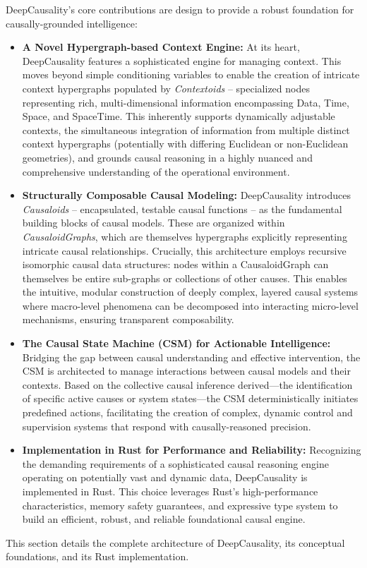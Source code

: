 DeepCausality’s core contributions are design to provide a robust foundation for causally-grounded intelligence:
\begin{itemize}
    \item \textbf{A Novel Hypergraph-based Context Engine:} At its heart, DeepCausality features a sophisticated engine for managing context. This moves beyond simple conditioning variables to enable the creation of intricate context hypergraphs populated by \textit{Contextoids} – specialized nodes representing rich, multi-dimensional information encompassing Data, Time, Space, and SpaceTime. This inherently supports dynamically adjustable contexts, the simultaneous integration of information from multiple distinct context hypergraphs (potentially with differing Euclidean or non-Euclidean geometries), and grounds causal reasoning in a highly nuanced and comprehensive understanding of the operational environment.
    \item \textbf{Structurally Composable Causal Modeling:} DeepCausality introduces \textit{Causaloids} – encapsulated, testable causal functions – as the fundamental building blocks of causal models. These are organized within \textit{CausaloidGraphs}, which are themselves hypergraphs explicitly representing intricate causal relationships. Crucially, this architecture employs recursive isomorphic causal data structures: nodes within a CausaloidGraph can themselves be entire sub-graphs or collections of other causes. This enables the intuitive, modular construction of deeply complex, layered causal systems where macro-level phenomena can be decomposed into interacting micro-level mechanisms, ensuring transparent composability.
    \item \textbf{The Causal State Machine (CSM) for Actionable Intelligence:} Bridging the gap between causal understanding and effective intervention, the CSM is architected to manage interactions between causal models and their contexts. Based on the collective causal inference derived—the identification of specific active causes or system states—the CSM deterministically initiates predefined actions, facilitating the creation of complex, dynamic control and supervision systems that respond with causally-reasoned precision.
    \item \textbf{Implementation in Rust for Performance and Reliability:} Recognizing the demanding requirements of a sophisticated causal reasoning engine operating on potentially vast and dynamic data, DeepCausality is implemented in Rust. This choice leverages Rust’s high-performance characteristics, memory safety guarantees, and expressive type system to build an efficient, robust, and reliable foundational causal engine.
    
\end{itemize}

This section details the complete architecture of DeepCausality, its conceptual foundations, and its Rust implementation.

\newpage